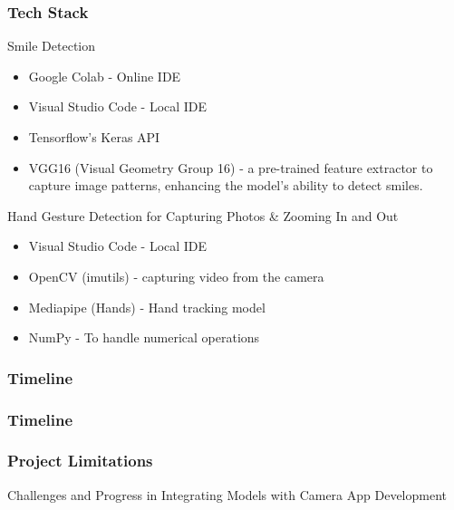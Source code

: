 \documentclass{beamer}
\begin{document}
\begin{frame}
\frametitle{Tech Stack}
\begin{block} {Smile Detection}
\begin{itemize}
    \item Google Colab - Online IDE
    \item Visual Studio Code - Local IDE
    \item Tensorflow's Keras API
    \item VGG16 (Visual Geometry Group 16) - a pre-trained feature extractor to capture image patterns, enhancing the model's ability to detect smiles.
\end{itemize}
    
\end{block}
\begin{block}{Hand Gesture Detection for Capturing Photos \& Zooming In and Out}
\begin{itemize}
    \item Visual Studio Code - Local IDE
    \item OpenCV (imutils) - capturing video from the camera
    \item Mediapipe (Hands) - Hand tracking model
    \item NumPy -  To handle numerical operations 
\end{itemize}
\end{block}
\end{frame}

\begin{frame}
\frametitle{Timeline}

\end{frame}

\begin{frame}
\frametitle{Timeline}

\end{frame}


\begin{frame}
\frametitle{Project Limitations}
\begin{block} {Challenges and Progress in Integrating Models with Camera App Development}
\end{block}
\end{frame}

\end{document}

